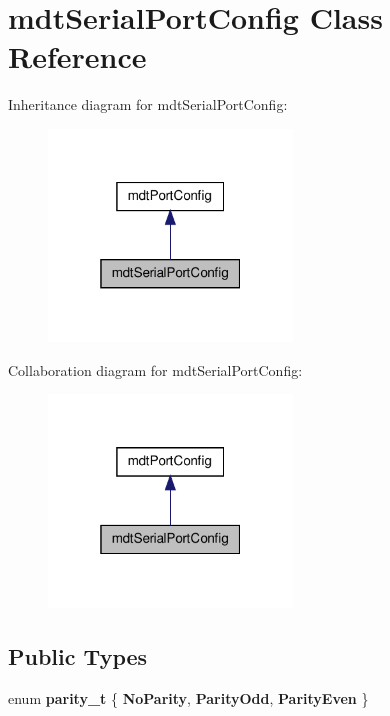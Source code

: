 \hypertarget{classmdt_serial_port_config}{
\section{mdtSerialPortConfig Class Reference}
\label{classmdt_serial_port_config}
}


Inheritance diagram for mdtSerialPortConfig:\nopagebreak
\begin{figure}[H]
\begin{center}
\leavevmode
\includegraphics[width=184pt]{classmdt_serial_port_config__inherit__graph}
\end{center}
\end{figure}


Collaboration diagram for mdtSerialPortConfig:\nopagebreak
\begin{figure}[H]
\begin{center}
\leavevmode
\includegraphics[width=184pt]{classmdt_serial_port_config__coll__graph}
\end{center}
\end{figure}
\subsection*{Public Types}
\begin{DoxyCompactItemize}
\item 
enum {\bfseries parity\_\-t} \{ {\bfseries NoParity}, 
{\bfseries ParityOdd}, 
{\bfseries ParityEven}
 \}
\end{DoxyCompactItemize}
